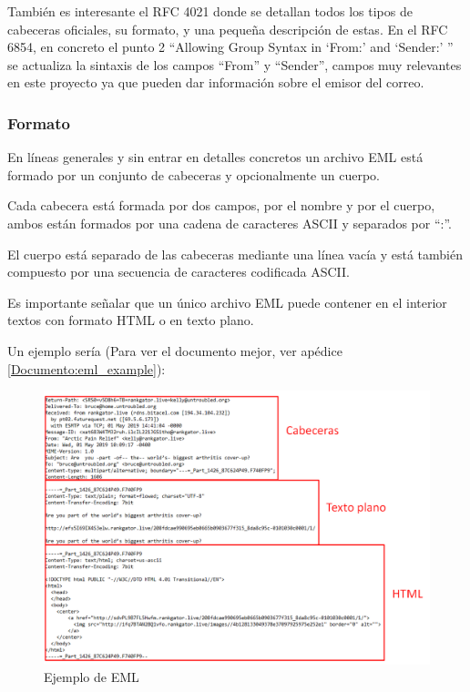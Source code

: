 También es interesante el RFC 4021\cite{rfc4021} donde se detallan todos los tipos de cabeceras oficiales, su formato, y una pequeña descripción de estas. En el RFC 6854\cite{rfc6854}, en concreto el punto 2 ``Allowing Group Syntax in `From:' and `Sender:' '' se actualiza la sintaxis de los campos “From” y “Sender”, campos muy relevantes en este proyecto ya que pueden dar información sobre el emisor del correo.

\subsubsection{Formato}
En líneas generales y sin entrar en detalles concretos un archivo EML está formado por un conjunto de cabeceras y opcionalmente un cuerpo. 

Cada cabecera está formada por dos campos, por el nombre y por el cuerpo, ambos están formados por una cadena de caracteres ASCII y separados por “:”.

El cuerpo está separado de las cabeceras mediante una línea vacía y está también compuesto por una secuencia de caracteres codificada ASCII. 

Es importante señalar que un único archivo EML puede contener en el interior textos con formato HTML o en texto plano.

Un ejemplo sería (Para ver el documento mejor, ver apédice \ref{Documento:eml_example}): 

\begin{figure}[H]
    \centering
    \includegraphics[scale=0.45]{imagenes/eml_example.png}
\caption{Ejemplo de EML}
\end{figure}


